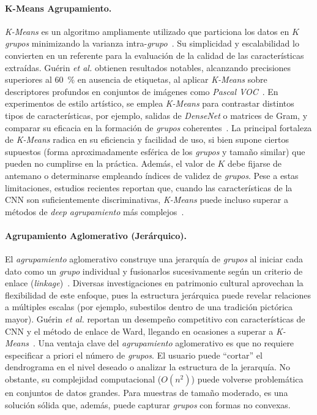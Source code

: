 \paragraph{K-Means Agrupamiento.}
\textit{K-Means} es un algoritmo ampliamente utilizado que particiona los datos en $K$ \textit{grupos} minimizando la varianza intra-\textit{grupo}~\cite{guerin2018,dangeti2024}.
Su simplicidad y escalabilidad lo convierten en un referente para la evaluación de la calidad de las características extraídas.
Guérin \textit{et al.} obtienen resultados notables, alcanzando precisiones superiores al 60~\% en ausencia de etiquetas, al aplicar \textit{K-Means} sobre descriptores profundos en conjuntos de imágenes como \textit{Pascal VOC}~\cite{guerin2018}.
En experimentos de estilo artístico, se emplea \textit{K-Means} para contrastar distintos tipos de características, por ejemplo, salidas de \textit{DenseNet} o matrices de Gram, y comparar su eficacia en la formación de \textit{grupos} coherentes~\cite{dangeti2024}.
La principal fortaleza de \textit{K-Means} radica en su eficiencia y facilidad de uso, si bien supone ciertos supuestos (forma aproximadamente esférica de los \textit{grupos} y tamaño similar) que pueden no cumplirse en la práctica.
Además, el valor de $K$ debe fijarse de antemano o determinarse empleando índices de validez de \textit{grupos}.
Pese a estas limitaciones, estudios recientes reportan que, cuando las características de la CNN son suficientemente discriminativas, \textit{K-Means} puede incluso superar a métodos de \textit{deep agrupamiento} más complejos~\cite{dangeti2024}.

\paragraph{Agrupamiento Aglomerativo (Jerárquico).}
El \textit{agrupamiento} aglomerativo construye una jerarquía de \textit{grupos} al iniciar cada dato como un \textit{grupo} individual y fusionarlos sucesivamente según un criterio de enlace (\textit{linkage})~\cite{guerin2018,parisotto2022}.
Diversas investigaciones en patrimonio cultural aprovechan la flexibilidad de este enfoque, pues la estructura jerárquica puede revelar relaciones a múltiples escalas (por ejemplo, subestilos dentro de una tradición pictórica mayor).
Guérin \textit{et al.} reportan un desempeño competitivo con características de CNN y el método de enlace de Ward, llegando en ocasiones a superar a \textit{K-Means}~\cite{guerin2018}.
Una ventaja clave del \textit{agrupamiento} aglomerativo es que no requiere especificar a priori el número de \textit{grupos}.
El usuario puede “cortar” el dendrograma en el nivel deseado o analizar la estructura de la jerarquía. No obstante, su complejidad computacional ($O(n^2)$) puede volverse problemática en conjuntos de datos grandes.
Para muestras de tamaño moderado, es una solución sólida que, además, puede capturar \textit{grupos} con formas no convexas.

